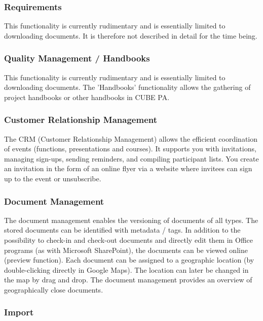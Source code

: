 \subsubsection{Requirements}

This functionality is currently rudimentary and is essentially limited to downloading documents. It is therefore not described in detail for the time being.

\subsubsection{Quality Management / Handbooks}

This functionality is currently rudimentary and is essentially limited to downloading documents. The 'Handbooks' functionality allows the gathering of project handbooks or other handbooks in CUBE PA.

\subsubsection{Customer Relationship Management}

The CRM (Customer Relationship Management) allows the efficient coordination of events (functions, presentations and courses). It supports you with invitations, managing sign-ups, sending reminders, and compiling participant lists. You create an invitation in the form of an online flyer via a website where invitees can sign up to the event or unsubscribe.

\subsubsection{Document Management}

The document management enables the versioning of documents of all types. The stored documents can be identified with metadata / tags. In addition to the possibility to check-in and check-out documents and directly edit them in Office programs (as with Microsoft SharePoint), the documents can be viewed online (preview function). Each document can be assigned to a geographic location (by double-clicking directly in Google Maps). The location can later be changed in the map by drag and drop. The document management provides an overview of geographically close documents.

\subsubsection{Import}

